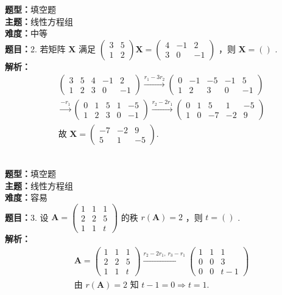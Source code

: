 \documentclass{ctexart}
\newenvironment{question}[5]{%
	\noindent\textbf{题型：}#1\\
	\textbf{主题：}#2\\
	\textbf{难度：}#3\\
	\textbf{题目：}#4\\
	\textbf{解析：}#5\\
	\vspace{1em}
}{}
\begin{document}
	\begin{question}
		{填空题}
		{线性方程组}
		{中等}
		{2. 若矩阵 \(\mathbf{X}\) 满足 \(\left(\begin{array}{ll}3 & 5 \\ 1 & 2\end{array}\right) \mathbf{X}=\left(\begin{array}{ccc}4 & -1 & 2 \\ 3 & 0 & -1\end{array}\right)\) ，则 \(\mathbf{X}=()\) . }
		{\[
			\begin{aligned}
				& \left(\begin{array}{cc|ccc}3 & 5 & 4 & -1 & 2 \\ 1 & 2 & 3 & 0 & -1\end{array}\right) \xrightarrow{r_1 - 3r_2} \left(\begin{array}{cc|ccc}0 & -1 & -5 & -1 & 5 \\ 1 & 2 & 3 & 0 & -1\end{array}\right) \\
				& \xrightarrow{-r_1} \left(\begin{array}{cc|ccc}0 & 1 & 5 & 1 & -5 \\ 1 & 2 & 3 & 0 & -1\end{array}\right) \xrightarrow{r_2 - 2r_1} \left(\begin{array}{cc|ccc}0 & 1 & 5 & 1 & -5 \\ 1 & 0 & -7 & -2 & 9\end{array}\right) \\
				& \text{故 } \mathbf{X}=\left(\begin{array}{ccc}-7 & -2 & 9 \\ 5 & 1 & -5\end{array}\right) . 
			\end{aligned}
			\]}
	\end{question}
	
	\begin{question}
		{填空题}
		{线性方程组}
		{容易}
		{3. 设 \(\mathbf{A}=\left(\begin{array}{lll}1 & 1 & 1 \\ 2 & 2 & 5 \\ 1 & 1 & t\end{array}\right)\) 的秩 \(r(\mathbf{A})=2\) ，则 \(t=()\) . }
		{\[
			\begin{aligned}
				& \mathbf{A} = \left(\begin{array}{ccc}1 & 1 & 1 \\ 2 & 2 & 5 \\ 1 & 1 & t\end{array}\right) \xrightarrow{r_2 - 2r_1,\, r_3 - r_1} \left(\begin{array}{ccc}1 & 1 & 1 \\ 0 & 0 & 3 \\ 0 & 0 & t - 1\end{array}\right) \\
				& \text{由 } r(\mathbf{A})=2 \text{ 知 } t - 1 = 0 \Rightarrow t = 1. 
			\end{aligned}
			\]}
	\end{question}
	
\end{document}
